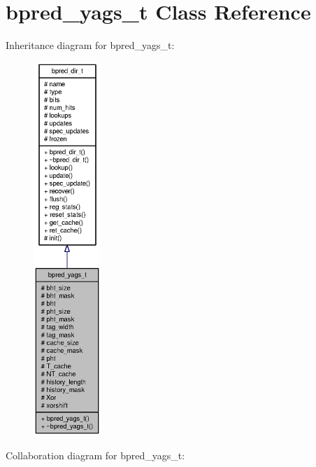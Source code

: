 \section{bpred\_\-yags\_\-t Class Reference}
\label{classbpred__yags__t}
Inheritance diagram for bpred\_\-yags\_\-t:\nopagebreak
\begin{figure}[H]
\begin{center}
\leavevmode
\includegraphics[height=400pt]{classbpred__yags__t__inherit__graph}
\end{center}
\end{figure}
Collaboration diagram for bpred\_\-yags\_\-t:\nopagebreak
